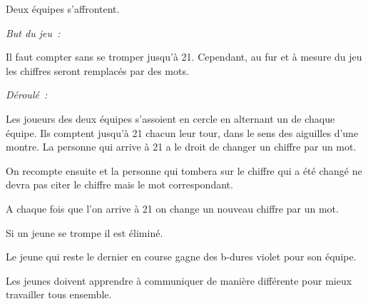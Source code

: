 \documentclass{grand-jeu}
\begin{document}
\begin{regles}
Deux équipes s’affrontent.

\vspace{0.2cm}
\emph{But du jeu :}

Il faut compter sans se tromper jusqu'à 21. Cependant, au fur et à mesure du jeu les chiffres seront remplacés par des mots. 

\vspace{0.2cm}
\emph{Déroulé :}

Les joueurs des deux équipes s'assoient en cercle en alternant un de chaque équipe. Ils comptent jusqu'à 21 chacun leur tour, dans le sens des aiguilles d’une montre. La personne qui arrive à 21 a le droit de changer un chiffre par un mot. 

On recompte ensuite et la personne qui tombera sur le chiffre qui a été changé ne devra pas citer le chiffre mais le mot correspondant. 

A chaque fois que l'on arrive à 21 on change un nouveau chiffre par un mot. 

Si un jeune se trompe il est éliminé.

Le jeune qui reste le dernier en course gagne des b-dures violet pour son équipe.
\end{regles}

\begin{imaginaire}
Les jeunes doivent apprendre à communiquer de manière différente pour mieux travailler tous ensemble.
\end{imaginaire}

\begin{moments-stop}
\end{moments-stop}
\end{document}
